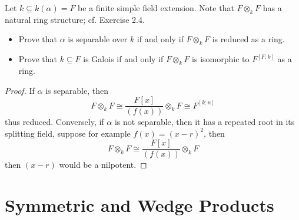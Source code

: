\documentclass[openany]{book}
\newcommand{\lambdaprod}{\wedge} %
\begin{document}
    
    \begin{prob}[2.10]
    Let \( k \subseteq k(\alpha) = F \) be a finite simple field extension. Note that \( F \otimes_k F \) has a natural ring structure; cf. Exercise 2.4.
    
    \begin{itemize}
        \item Prove that \( \alpha \) is separable over \( k \) if and only if \( F \otimes_k F \) is reduced as a ring.
        \item Prove that \( k \subseteq F \) is Galois if and only if \( F \otimes_k F \) is isomorphic to \( F^{[F:k]} \) as a ring.
    \end{itemize}
    \end{prob}
\begin{proof}
    If $\alpha$ is separable, then 
    \begin{equation*}
        F\otimes_kF\cong \frac{F[x]}{(f(x))}\otimes_kF\cong F^{[k:n]}
    \end{equation*}
    thus reduced.
    Conversely, if $\alpha$ is not separable, then it has a repeated root in its splitting field, suppose for example $f(x)=(x-r)^2$, then 
    \begin{equation*}
        F\otimes_kF\cong\frac{F[x]}{(f(x))}\otimes_kF
    \end{equation*}
    then $(x-r)$ would be a nilpotent.
\end{proof}



\section{Symmetric and Wedge Products}
    
\end{document}
